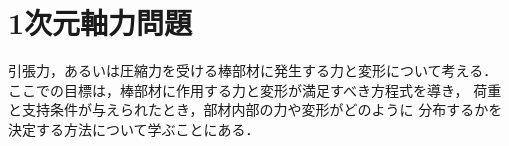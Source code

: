 \documentclass[10pt,a4j]{jbook}
\newlength{\minitwocolumn}
\begin{document}
\newcommand{\fat}[1]{\mbox{\boldmath $#1$}}
\newcommand{\D}{\partial}
\newcommand{\w}{\omega}
\newcommand{\ga}{\alpha}
\newcommand{\gb}{\beta}
\newcommand{\gx}{\xi}
\newcommand{\gz}{\zeta}
\newcommand{\vhat}[1]{\hat{\fat{#1}}}
\newcommand{\spc}{\vspace{0.7\baselineskip}}
\newcommand{\halfspc}{\vspace{0.3\baselineskip}}

\newcommand{\twofig}[2]
 {
   \begin{figure}
     \begin{minipage}[t]{\minitwocolumn}
         \begin{center}   #1
         \end{center}
     \end{minipage}
         \hspace{\columnsep}
     \begin{minipage}[t]{\minitwocolumn}
         \begin{center} #2
         \end{center}
     \end{minipage}
   \end{figure}
 }
\chapter{1次元軸力問題}
引張力，あるいは圧縮力を受ける棒部材に発生する力と変形について考える．
ここでの目標は，棒部材に作用する力と変形が満足すべき方程式を導き，
荷重と支持条件が与えられたとき，部材内部の力や変形がどのように
分布するかを決定する方法について学ぶことにある．
\end{document}
